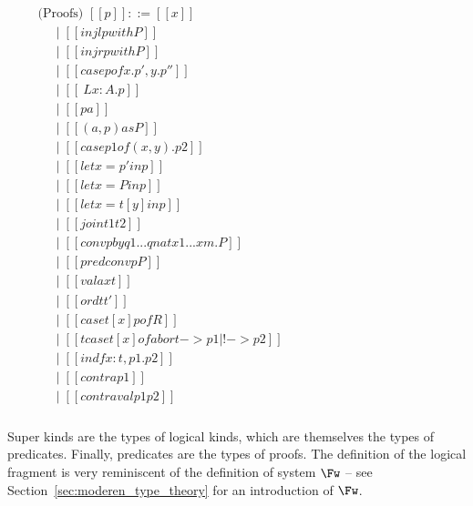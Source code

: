 \begin{center}
\begin{math}
\begin{array}{llllllllllllllll}
\begin{array}{llllll}
      \end{array}
      &
      \begin{array}{lll}
        \text{(Proofs) } [[p]] ::= [[x]] \\
        \,\,\,\,\,\,\,\mid [[injl p with P]] \\
        \,\,\,\,\,\,\,\mid [[injr p with P]] \\
        \,\,\,\,\,\,\,\mid [[case p of x . p' , y . p'']] \\
        \,\,\,\,\,\,\,\mid [[\ L x : A . p]] \\
        \,\,\,\,\,\,\,\mid [[p a]] \\ 
        \,\,\,\,\,\,\,\mid [[(a , p ) as P]] \\
        \,\,\,\,\,\,\,\mid [[case p1 of ( x , y ) . p2]] \\
        \,\,\,\,\,\,\,\mid [[let x = p' in p]] \\
        \,\,\,\,\,\,\,\mid [[let x = P in p]] \\
        \,\,\,\,\,\,\,\mid [[let x = t [ y ] in p]] \\
        \,\,\,\,\,\,\,\mid [[join t1 t2]] \\
        \,\,\,\,\,\,\,\mid [[conv p by q1 ... qn at x1 ... xm . P]] \\
        \,\,\,\,\,\,\,\mid [[predconv p P]] \\
        \,\,\,\,\,\,\,\mid [[valax t]] \\
        \,\,\,\,\,\,\,\mid [[ord t t']] \\
        \,\,\,\,\,\,\,\mid [[case t [ x ] p of R]] \\
        \,\,\,\,\,\,\,\mid [[tcase t [ x ] of abort -> p1 | ! -> p2]] \\
        \,\,\,\,\,\,\,\mid [[ind f x : t , p1 . p2]] \\
        \,\,\,\,\,\,\,\mid [[contra p1]] \\
        \,\,\,\,\,\,\,\mid [[contraval p1 p2]]\\
      \end{array}
    \end{array}
  \end{math}
\end{center}
Super kinds are the types of logical kinds, which are themselves the
types of predicates.  Finally, predicates are the types of proofs.
The definition of the logical fragment is very reminiscent of the
definition of system $\Fw$ -- see
Section~\ref{sec:moderen_type_theory} for an introduction of $\Fw$.
